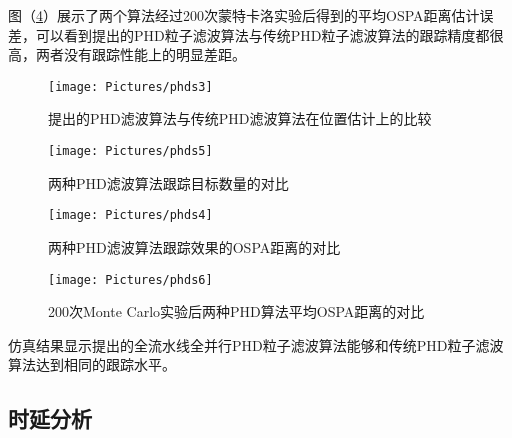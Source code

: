 图（\ref{fig:212}）展示了两个算法经过200次蒙特卡洛实验后得到的平均OSPA距离估计误差，可以看到提出的PHD粒子滤波算法与传统PHD粒子滤波算法的跟踪精度都很高，两者没有跟踪性能上的明显差距。

\begin{figure}[htbp]
\centering
\texttt{[image: Pictures/phds3]}
\caption{提出的PHD滤波算法与传统PHD滤波算法在位置估计上的比较}
\label{fig:09}
\end{figure}

\begin{figure}[htbp]
\centering
\texttt{[image: Pictures/phds5]}
\caption{两种PHD滤波算法跟踪目标数量的对比}
\label{fig:10}
\end{figure}

\begin{figure}[htbp]
\centering
\texttt{[image: Pictures/phds4]}
\caption{两种PHD滤波算法跟踪效果的OSPA距离的对比}
\label{fig:11}
\end{figure}


\begin{figure}[htbp]
\centering
\texttt{[image: Pictures/phds6]}
\caption{200次Monte Carlo实验后两种PHD算法平均OSPA距离的对比}
\label{fig:212}
\end{figure}

仿真结果显示提出的全流水线全并行PHD粒子滤波算法能够和传统PHD粒子滤波算法达到相同的跟踪水平。

\subsection{时延分析}

